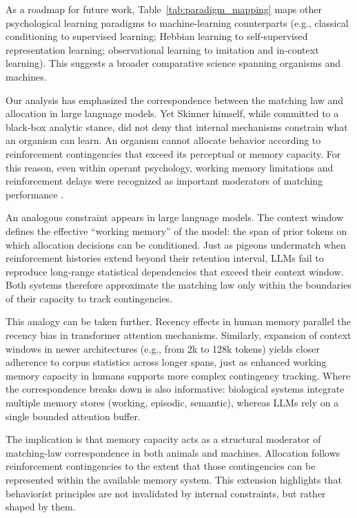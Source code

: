 \documentclass[11pt]{article}
\begin{document}
As a roadmap for future work, Table~\ref{tab:paradigm_mapping} maps
other psychological learning paradigms to machine‑learning
counterparts (e.g., classical conditioning to supervised learning;
Hebbian learning to self‑supervised representation learning;
observational learning to imitation and in‑context learning). This
suggests a broader comparative science spanning organisms and
machines.

Our analysis has emphasized the correspondence between the matching
law and allocation in large language models. Yet Skinner himself,
while committed to a black-box analytic stance, did not deny that
internal mechanisms constrain what an organism can learn. An organism
cannot allocate behavior according to reinforcement contingencies that
exceed its perceptual or memory capacity. For this reason, even within
operant psychology, working memory limitations and reinforcement
delays were recognized as important moderators of matching performance
\citep{baum1974generalized,shimp1976short}.

An analogous constraint appears in large language models. The context
window defines the effective “working memory” of the model: the span
of prior tokens on which allocation decisions can be conditioned. Just
as pigeons undermatch when reinforcement histories extend beyond their
retention interval, LLMs fail to reproduce long-range statistical
dependencies that exceed their context window. Both systems therefore
approximate the matching law only within the boundaries of their
capacity to track contingencies.

This analogy can be taken further. Recency effects in human memory
parallel the recency bias in transformer attention
mechanisms. Similarly, expansion of context windows in newer
architectures (e.g., from 2k to 128k tokens) yields closer adherence
to corpus statistics across longer spans, just as enhanced working
memory capacity in humans supports more complex contingency
tracking. Where the correspondence breaks down is also informative:
biological systems integrate multiple memory stores (working,
episodic, semantic), whereas LLMs rely on a single bounded attention
buffer.

The implication is that memory capacity acts as a structural moderator
of matching-law correspondence in both animals and
machines. Allocation follows reinforcement contingencies to the extent
that those contingencies can be represented within the available
memory system. This extension highlights that behaviorist principles
are not invalidated by internal constraints, but rather shaped by
them.
\end{document}
